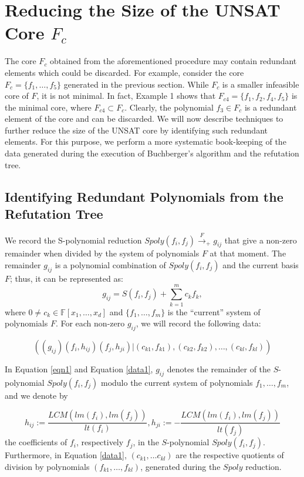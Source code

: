 \section{Reducing the Size of the UNSAT Core $F_c$}
\label{sec:alg}
The core $F_c$ obtained from the aforementioned procedure may
contain redundant elements which could be discarded. For
example, consider the core $F_c=\{f_1,\dots, f_5\}$ generated in the
previous section. While $F_c$ is a smaller infeasible core of $F$, it
is not minimal. In fact, Example 1 shows that $F_{c4} =\{f_1,f_2,f_4,f_5\}$ is the
minimal core, where $F_{c4} \subset F_{c}$. Clearly, the polynomial
$f_3 \in F_c$ is a redundant element of the core and can be 
discarded. We will now describe techniques to further reduce the size
of the UNSAT core by identifying such redundant elements. 
For this purpose, we perform a more 
systematic book-keeping of the data generated during the execution of
Buchberger's algorithm and the refutation tree. 

\subsection{Identifying Redundant Polynomials from the Refutation Tree}

We record the S-polynomial reduction
$Spoly(f_i,f_j)\xrightarrow{F}_+{g_{ij}}$ that give a non-zero
remainder when divided by the system of polynomials $F$ at that
moment. The remainder $g_{ij}$ is a polynomial combination of
$Spoly(f_i,f_j)$ and the current basis $F$; thus, it can be
represented as:
\begin{equation}
\label{eqn1}
g_{ij}= S(f_i,f_j)+\displaystyle\sum_{k=1}^m c_kf_k,
\end{equation}
where $0\neq c_k\in\mathbb{F}[x_1,\ldots,x_d]$ and
$\{f_1,\ldots,f_m\}$ is the ``current'' system of polynomials
$F$. For each non-zero $g_{ij}$, we will record the following data: 

\begin{equation}
\label{data1}
((g_{ij})(f_{i},h_{ij})(f_{j},h_{ji})| (c_{k1},f_{k1}),(c_{k2},f_{k2}),\dots,(c_{kl},f_{kl}))
\end{equation}

In Equation \ref{eqn1} and Equation \ref{data1}, $g_{ij}$ denotes the
remainder of the $S$-polynomial $Spoly(f_i,f_j)$ modulo the current system
of polynomials $f_1,\ldots,f_m$, and we denote by  

$$h_{ij}:=\displaystyle\frac{LCM(lm(f_i),lm(f_j))}{lt(f_i)},
h_{ji}:= - \displaystyle\frac{LCM(lm(f_i),lm(f_j))}{lt(f_j)}$$ 
the coefficients of $f_i$, respectively $f_j$, in the $S$-polynomial
$Spoly(f_i,f_j)$. Furthermore, in Equation \ref{data1}, $(c_{k1}, \dots
c_{kl})$ are the respective quotients of division by
polynomials $(f_{k1},\dots,f_{kl})$, generated during the $Spoly$ reduction.  

